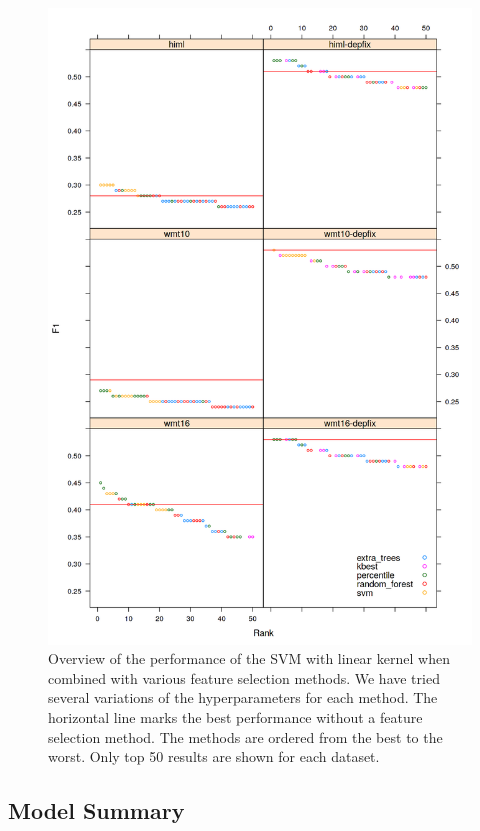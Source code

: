 \begin{figure}
\centering
  \includegraphics[scale=0.7]{wf-sel}
  \caption{
    Overview of the performance of the SVM with linear kernel when combined with various feature selection methods.
We have tried several variations of the hyperparameters
for each method. The horizontal line marks the best performance without
a feature selection method. The methods are ordered from the best to the worst. Only top 50 results
are shown for each dataset.
}
  \label{wf-sel}
\end{figure}


\subsection{Model Summary}

